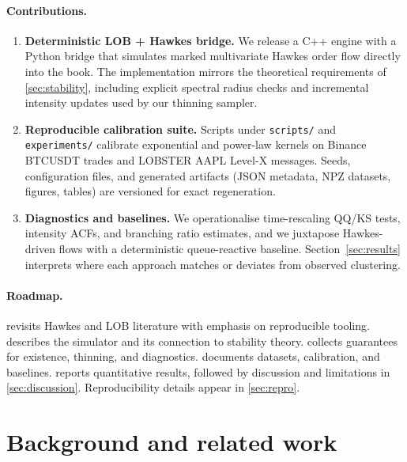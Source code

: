 \documentclass[11pt]{article}
\newcommand{\1}{\mathbbm{1}}
\begin{document}
\paragraph{Contributions.}
\begin{enumerate}[leftmargin=*, itemsep=2pt]
  \item \textbf{Deterministic LOB + Hawkes bridge.} We release a C++ engine with a Python bridge that simulates marked multivariate Hawkes order flow directly into the book. The implementation mirrors the theoretical requirements of \cref{sec:stability}, including explicit spectral radius checks and incremental intensity updates used by our thinning sampler.
  \item \textbf{Reproducible calibration suite.} Scripts under \texttt{scripts/} and \texttt{experiments/} calibrate exponential and power-law kernels on Binance BTCUSDT trades and LOBSTER AAPL Level-X messages. Seeds, configuration files, and generated artifacts (JSON metadata, NPZ datasets, figures, tables) are versioned for exact regeneration.
  \item \textbf{Diagnostics and baselines.} We operationalise time-rescaling QQ/KS tests, intensity ACFs, and branching ratio estimates, and we juxtapose Hawkes-driven flows with a deterministic queue-reactive baseline. Section~\ref{sec:results} interprets where each approach matches or deviates from observed clustering.
\end{enumerate}

\paragraph{Roadmap.}  revisits Hawkes and LOB literature with emphasis on reproducible tooling.  describes the simulator and its connection to stability theory.  collects guarantees for existence, thinning, and diagnostics.  documents datasets, calibration, and baselines.  reports quantitative results, followed by discussion and limitations in \cref{sec:discussion}. Reproducibility details appear in \cref{sec:repro}.

\section{Background and related work}\label{sec:related}
\end{document}
